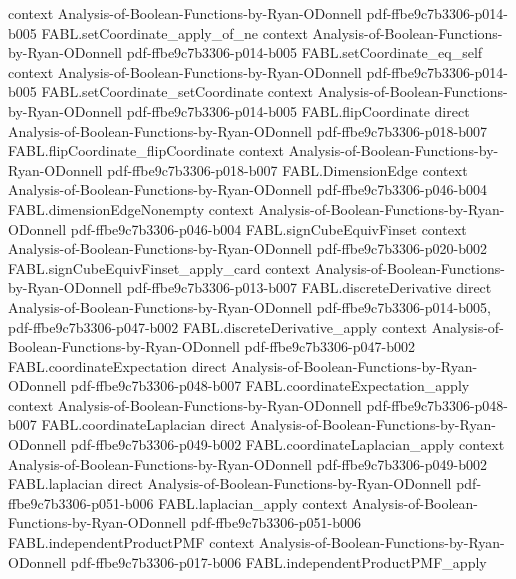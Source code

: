 \begin{theorem}
  {context}
  {Analysis-of-Boolean-Functions-by-Ryan-ODonnell}
  {pdf-ffbe9c7b3306-p014-b005}
\proofstep
  {FABL.setCoordinate_apply_of_ne}
  {context}
  {Analysis-of-Boolean-Functions-by-Ryan-ODonnell}
  {pdf-ffbe9c7b3306-p014-b005}
\proofstep
  {FABL.setCoordinate_eq_self}
  {context}
  {Analysis-of-Boolean-Functions-by-Ryan-ODonnell}
  {pdf-ffbe9c7b3306-p014-b005}
\proofstep
  {FABL.setCoordinate_setCoordinate}
  {context}
  {Analysis-of-Boolean-Functions-by-Ryan-ODonnell}
  {pdf-ffbe9c7b3306-p014-b005}
\proofstep
  {FABL.flipCoordinate}
  {direct}
  {Analysis-of-Boolean-Functions-by-Ryan-ODonnell}
  {pdf-ffbe9c7b3306-p018-b007}
\proofstep
  {FABL.flipCoordinate_flipCoordinate}
  {context}
  {Analysis-of-Boolean-Functions-by-Ryan-ODonnell}
  {pdf-ffbe9c7b3306-p018-b007}
\proofstep
  {FABL.DimensionEdge}
  {context}
  {Analysis-of-Boolean-Functions-by-Ryan-ODonnell}
  {pdf-ffbe9c7b3306-p046-b004}
\proofstep
  {FABL.dimensionEdgeNonempty}
  {context}
  {Analysis-of-Boolean-Functions-by-Ryan-ODonnell}
  {pdf-ffbe9c7b3306-p046-b004}
\proofstep
  {FABL.signCubeEquivFinset}
  {context}
  {Analysis-of-Boolean-Functions-by-Ryan-ODonnell}
  {pdf-ffbe9c7b3306-p020-b002}
\proofstep
  {FABL.signCubeEquivFinset_apply_card}
  {context}
  {Analysis-of-Boolean-Functions-by-Ryan-ODonnell}
  {pdf-ffbe9c7b3306-p013-b007}
\proofstep
  {FABL.discreteDerivative}
  {direct}
  {Analysis-of-Boolean-Functions-by-Ryan-ODonnell}
  {pdf-ffbe9c7b3306-p014-b005,
    pdf-ffbe9c7b3306-p047-b002}
\proofstep
  {FABL.discreteDerivative_apply}
  {context}
  {Analysis-of-Boolean-Functions-by-Ryan-ODonnell}
  {pdf-ffbe9c7b3306-p047-b002}
\proofstep
  {FABL.coordinateExpectation}
  {direct}
  {Analysis-of-Boolean-Functions-by-Ryan-ODonnell}
  {pdf-ffbe9c7b3306-p048-b007}
\proofstep
  {FABL.coordinateExpectation_apply}
  {context}
  {Analysis-of-Boolean-Functions-by-Ryan-ODonnell}
  {pdf-ffbe9c7b3306-p048-b007}
\proofstep
  {FABL.coordinateLaplacian}
  {direct}
  {Analysis-of-Boolean-Functions-by-Ryan-ODonnell}
  {pdf-ffbe9c7b3306-p049-b002}
\proofstep
  {FABL.coordinateLaplacian_apply}
  {context}
  {Analysis-of-Boolean-Functions-by-Ryan-ODonnell}
  {pdf-ffbe9c7b3306-p049-b002}
\proofstep
  {FABL.laplacian}
  {direct}
  {Analysis-of-Boolean-Functions-by-Ryan-ODonnell}
  {pdf-ffbe9c7b3306-p051-b006}
\proofstep
  {FABL.laplacian_apply}
  {context}
  {Analysis-of-Boolean-Functions-by-Ryan-ODonnell}
  {pdf-ffbe9c7b3306-p051-b006}
\proofstep
  {FABL.independentProductPMF}
  {context}
  {Analysis-of-Boolean-Functions-by-Ryan-ODonnell}
  {pdf-ffbe9c7b3306-p017-b006}
\proofstep
  {FABL.independentProductPMF_apply}

\end{theorem}
